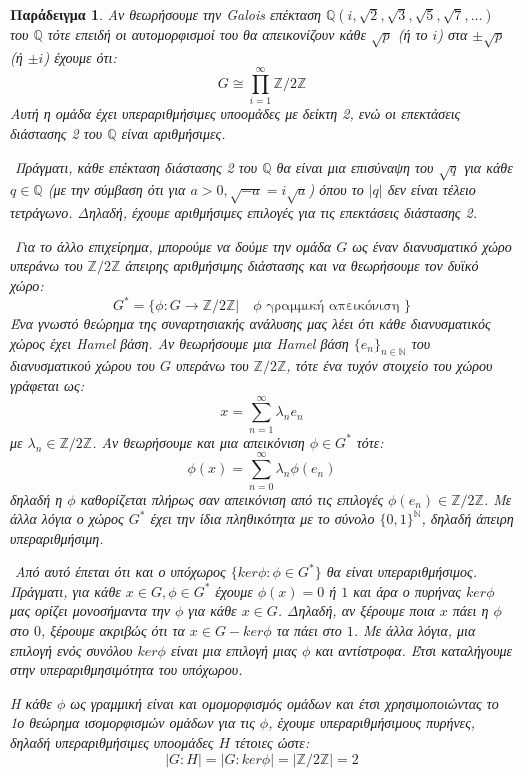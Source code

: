 \documentclass[oneside,a4paper]{article}
\newtheorem{example}{Παράδειγμα}
\newcommand {\tl}{\textlatin}
\newcommand{\Z}{\mathbb{Z}}
\newcommand{\Q}{\mathbb{Q}}
\begin{document}
\vspace{0.3truecm}
\begin{example}
	Αν θεωρήσουμε την \tl{Galois} επέκταση $\Q (i, \sqrt 2 , \sqrt 3 , \sqrt 5 , \sqrt 7 , \ldots)$ του $\Q$ τότε επειδή οι αυτομορφισμοί του θα απεικονίζουν κάθε $\sqrt p$ (ή το $i$) στα $ \pm \sqrt p$ (ή $\pm i$) έχουμε ότι:
	$$G \cong \prod\limits_{i=1}^{\infty} \Z / 2 \Z$$
	Αυτή η ομάδα έχει υπεραριθμήσιμες υποομάδες με δείκτη 2, ενώ οι επεκτάσεις διάστασης 2 του $\Q$ είναι αριθμήσιμες. 

	$ $\newline
	Πράγματι, κάθε επέκταση διάστασης 2 του $\Q$ θα είναι μια επισύναψη του $\sqrt{q}$ για κάθε $q\in \mathbb{Q}$ (με την σύμβαση ότι για $a>0, \sqrt{-a}=i\sqrt{a}$) όπου το $|q|$ δεν είναι τέλειο τετράγωνο. Δηλαδή, έχουμε αριθμήσιμες επιλογές για τις επεκτάσεις διάστασης 2.

	$ $\newline
	Για το άλλο επιχείρημα, μπορούμε να δούμε την ομάδα $G$ ως έναν διανυσματικό χώρο υπεράνω του $\mathbb Z / 2\mathbb Z$ άπειρης αριθμήσιμης διάστασης και να θεωρήσουμε τον δυϊκό χώρο:
	$$G^* = \{\phi: G\rightarrow \Z / 2\Z | \quad \phi \text{ γραμμική απεικόνιση }\}$$
	Ένα γνωστό θεώρημα της συναρτησιακής ανάλυσης μας λέει ότι κάθε διανυσματικός χώρος έχει \tl{Hamel} βάση. Αν θεωρήσουμε μια \tl{Hamel} βάση $\{e_n\}_{n \in \mathbb N}$ του διανυσματικού χώρου του $G$ υπεράνω του $\Z / 2 \Z$, τότε ένα τυχόν στοιχείο του χώρου γράφεται ως:
	$$x = \sum\limits_{n=1}^{\infty} \lambda_n e_n$$
	με $\lambda_n \in \Z / 2\Z$. Αν θεωρήσουμε και μια απεικόνιση $\phi \in G^*$ τότε:
	$$\phi (x) = \sum\limits_{n=0}^{\infty} \lambda_n \phi (e_n)$$
	δηλαδή η $\phi$ καθορίζεται πλήρως σαν απεικόνιση από τις επιλογές $\phi (e_n) \in \Z / 2 \Z$. Με άλλα λόγια ο χώρος $G^*$ έχει την ίδια πληθικότητα με το σύνολο $\{0,1\}^{\mathbb N}$, δηλαδή άπειρη υπεραριθμήσιμη.
	
	$ $\newline
	Από αυτό έπεται ότι και ο υπόχωρος $\{ ker\phi : \phi \in G^*\}$ θα είναι υπεραριθμήσιμος. Πράγματι, για κάθε $x \in G, \phi \in G^*$ έχουμε $\phi (x) = 0$ ή $1$ και άρα ο πυρήνας $ker\phi$ μας ορίζει μονοσήμαντα την $\phi$ για κάθε $x \in G$. Δηλαδή, αν ξέρουμε ποια $x$ πάει η $\phi$ στο $0$, ξέρουμε ακριβώς ότι τα $x \in G-ker\phi$ τα πάει στο $1$. Με άλλα λόγια, μια επιλογή ενός συνόλου $ker\phi$ είναι μια επιλογή μιας $\phi$ και αντίστροφα. Έτσι καταλήγουμε στην υπεραριθμησιμότητα του υπόχωρου.

	$ $\newline Η κάθε $\phi$ ως γραμμική είναι και ομομορφισμός ομάδων και έτσι χρησιμοποιώντας το 1ο θεώρημα ισομορφισμών ομάδων για τις $\phi$, έχουμε υπεραριθμήσιμους πυρήνες, δηλαδή υπεραριθμήσιμες υποομάδες $H$ τέτοιες ώστε:
	$$|G:H| = |G:ker\phi| = |\Z / 2\Z |  = 2$$

\end{example}
\end{document}
